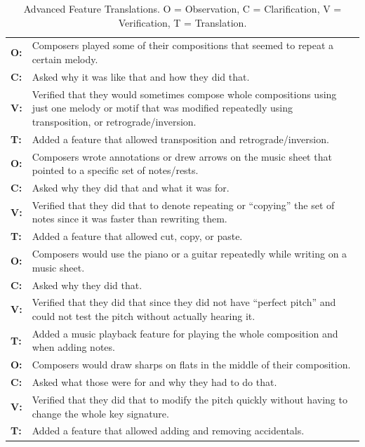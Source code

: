 		\begin{table} [H]
			\caption{Advanced Feature Translations. O = Observation, C = Clarification, V = Verification, T = Translation.} \label{tab:feature-translations-advanced}
			\vspace{0.20cm}   
			\begin{tabular}{|p{.5cm} p{13.5cm}|}
			  	\hline

			  	\textbf{O:} 	& Composers played some of their compositions that seemed to repeat a certain melody. \\
			  	\textbf{C:} 	& Asked why it was like that and how they did that. \\
			  	\textbf{V:} 	& Verified that they would sometimes compose whole compositions using just one melody or motif that was modified repeatedly using transposition, or retrograde/inversion. \\
			  	\textbf{T:} 	& Added a feature that allowed transposition and retrograde/inversion. \\
			  	\hline

			  	\textbf{O:} 	& Composers wrote annotations or drew arrows on the music sheet that pointed to a specific set of notes/rests. \\
			  	\textbf{C:} 	& Asked why they did that and what it was for. \\
			  	\textbf{V:} 	& Verified that they did that to denote repeating or ``copying'' the set of notes since it was faster than rewriting them. \\
			  	\textbf{T:} 	& Added a feature that allowed cut, copy, or paste. \\
			  	\hline

			  	\textbf{O:} 	& Composers would use the piano or a guitar repeatedly while writing on a music sheet. \\
			  	\textbf{C:} 	& Asked why they did that. \\
			  	\textbf{V:} 	& Verified that they did that since they did not have ``perfect pitch'' and could not test the pitch without actually hearing it. \\
			  	\textbf{T:} 	& Added a music playback feature for playing the whole composition and when adding notes.  \\
			  	\hline

			  	\textbf{O:} 	& Composers would draw sharps on flats in the middle of their composition. \\
			  	\textbf{C:} 	& Asked what those were for and why they had to do that. \\
			  	\textbf{V:} 	& Verified that they did that to modify the pitch quickly without having to change the whole key signature. \\
			  	\textbf{T:} 	& Added a feature that allowed adding and removing accidentals.  \\
			  	\hline


\end{tabular}
\end{table}
